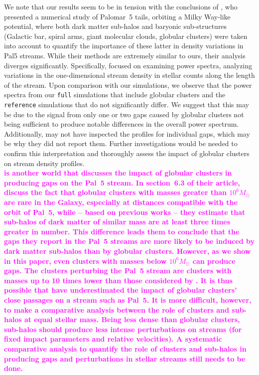 \documentclass{aa}
\newcommand{\paola}[1]{\textcolor{magenta}{{#1}}}
\begin{document}
  We note that our results seem to be in tension with the conclusions of \citet{2019MNRAS.484.2009B}, who presented a numerical study of Palomar~5 tails, orbiting a Milky Way-like potential, where both dark matter sub-halos and baryonic sub-structures (Galactic bar, spiral arms, giant molecular clouds, globular clusters) were taken into account to quantify the importance of these latter in density variations in Pal5 streams. While their methods are extremely similar to ours, their analysis diverges significantly. Specifically, \citet{2019MNRAS.484.2009B} focused on examining power spectra, analyzing variations in the one-dimensional stream density in stellar counts along the length of the stream. Upon comparison with our simulations, we observe that the power spectra from our \texttt{full} simulations that include globular clusters and the \texttt{reference} simulations that do not significantly differ. We suggest that this may be due to the signal from only one or two gaps caused by globular clusters not being sufficient to produce notable differences in the overall power spectrum. Additionally, \citet{2019MNRAS.484.2009B} may not have inspected the profiles for individual gaps, which may be why they did not report them. Further investigations would be needed to confirm this interpretation and thoroughly assess the impact of globular clusters on stream density profiles. \\

  \textbf{ \paola{\citet{2017MNRAS.470...60E} is another world that discusses the impact of globular clusters in producing gaps on the Pal~5 stream. In section~6.3 of their article, \citet{2017MNRAS.470...60E} discuss the fact that globular clusters with masses greater than $10^6 M_\odot$ are rare in the Galaxy, especially at distances compatible with the orbit of Pal~5, while -- based on previous works -- they estimate that sub-halos of dark matter of similar mass are at least three times greater in number. This difference leads them to conclude that the gaps they report in the Pal~5 streams are more likely to be induced by dark matter sub-halos than by globular clusters. 
  However, as we show in this paper, even clusters with masses below $10^6 M_\odot$ can produce gaps. The clusters perturbing the Pal~5 stream are clusters with masses up to 10 times lower than those considered by \citet{2017MNRAS.470...60E}. It is thus possible that \citet{2017MNRAS.470...60E} have underestimated the impact of globular clusters' close passages on a stream such as Pal~5. It is more difficult, however, to make a comparative analysis between the role of clusters and sub-halos at equal stellar mass. Being less dense than globular clusters, sub-halos should produce less intense perturbations on streams (for fixed impact parameters and relative velocities). A systematic comparative analysis to quantify the role of clusters and sub-halos in producing gaps and perturbations in stellar streams still needs to be done.}}
\end{document}

